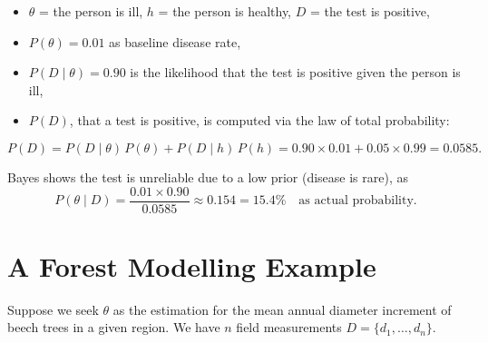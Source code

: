 \documentclass[12pt, a4paper]{article}
\begin{document}
\begin{itemize}
    \item $\theta$ = the person is ill, $h$ = the person is healthy, $D$ = the test is positive,
    \item $P(\theta) = 0.01$ as baseline disease rate,
    \item $P(D \mid \theta) = 0.90$ is the likelihood that the test is positive
          given the person is ill,
    \item $P(D)$, that a test is positive, is computed via the law of total probability:
\end{itemize}
\vspace{-1mm}
\begin{equation}
    P(D) = P(D \mid \theta)\,P(\theta)
         + P(D \mid h)\,P(h)
         = 0.90 \times 0.01 + 0.05 \times 0.99 = 0.0585.
\end{equation}

Bayes shows the test is unreliable due to a low prior (disease is rare), as
\vspace{-1mm}
\begin{equation}
    P(\theta \mid D)
        = \frac{0.01 \times 0.90}{0.0585}
        \approx 0.154 = 15.4\% \quad \text{as actual probability}.
\end{equation}






\section{A Forest Modelling Example}

Suppose we seek $\theta$ as the estimation for the mean annual diameter
increment of beech trees in a given region. We have $n$ field measurements $D = \{d_1, \ldots, d_n\}$.
\end{document}
